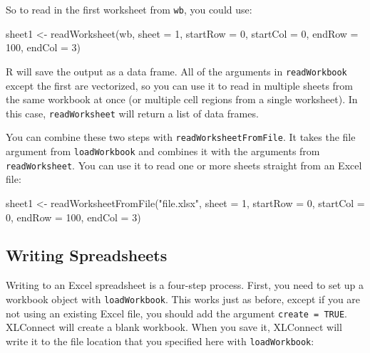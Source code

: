 \documentclass[
  letterpaper,
  DIV=11,
  numbers=noendperiod]{scrbook}
\newenvironment{Shaded}{\begin{snugshade}}{\end{snugshade}}
\newcommand{\AttributeTok}[1]{\textcolor[rgb]{0.40,0.45,0.13}{#1}}
\newcommand{\DecValTok}[1]{\textcolor[rgb]{0.68,0.00,0.00}{#1}}
\newcommand{\FunctionTok}[1]{\textcolor[rgb]{0.28,0.35,0.67}{#1}}
\newcommand{\NormalTok}[1]{\textcolor[rgb]{0.00,0.23,0.31}{#1}}
\newcommand{\OtherTok}[1]{\textcolor[rgb]{0.00,0.23,0.31}{#1}}
\newcommand{\StringTok}[1]{\textcolor[rgb]{0.13,0.47,0.30}{#1}}
\begin{document}
So to read in the first worksheet from \texttt{wb}, you could use:

\begin{Shaded}
\begin{Highlighting}[]
\NormalTok{sheet1 }\OtherTok{\textless{}{-}} \FunctionTok{readWorksheet}\NormalTok{(wb, }\AttributeTok{sheet =} \DecValTok{1}\NormalTok{, }\AttributeTok{startRow =} \DecValTok{0}\NormalTok{, }\AttributeTok{startCol =} \DecValTok{0}\NormalTok{, }
  \AttributeTok{endRow =} \DecValTok{100}\NormalTok{, }\AttributeTok{endCol =} \DecValTok{3}\NormalTok{)}
\end{Highlighting}
\end{Shaded}

R will save the output as a data frame. All of the arguments in
\texttt{readWorkbook} except the first are vectorized, so you can use it
to read in multiple sheets from the same workbook at once (or multiple
cell regions from a single worksheet). In this case,
\texttt{readWorksheet} will return a list of data frames.

You can combine these two steps with \texttt{readWorksheetFromFile}. It
takes the file argument from \texttt{loadWorkbook} and combines it with
the arguments from \texttt{readWorksheet}. You can use it to read one or
more sheets straight from an Excel file:

\begin{Shaded}
\begin{Highlighting}[]
\NormalTok{sheet1 }\OtherTok{\textless{}{-}} \FunctionTok{readWorksheetFromFile}\NormalTok{(}\StringTok{"file.xlsx"}\NormalTok{, }\AttributeTok{sheet =} \DecValTok{1}\NormalTok{, }\AttributeTok{startRow =} \DecValTok{0}\NormalTok{, }
  \AttributeTok{startCol =} \DecValTok{0}\NormalTok{, }\AttributeTok{endRow =} \DecValTok{100}\NormalTok{, }\AttributeTok{endCol =} \DecValTok{3}\NormalTok{)}
\end{Highlighting}
\end{Shaded}

\subsection{Writing Spreadsheets}\label{writing-spreadsheets}

Writing to an Excel spreadsheet is a four-step process. First, you need
to set up a workbook object with \texttt{loadWorkbook}. This works just
as before, except if you are not using an existing Excel file, you
should add the argument \texttt{create\ =\ TRUE}. XLConnect will create
a blank workbook. When you save it, XLConnect will write it to the file
location that you specified here with \texttt{loadWorkbook}:
\end{document}
